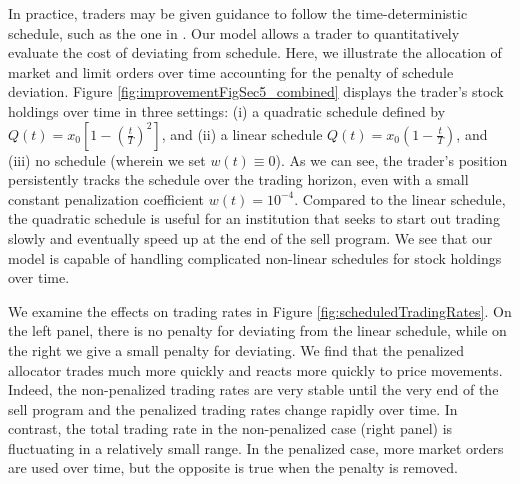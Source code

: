 \documentclass[12pt, letterpaper]{article}
\numberwithin{equation}{section}
\numberwithin{theorem}{section}
\begin{document}

In practice,  traders may be given guidance to follow the time-deterministic schedule, such as the one     in  \cite{AC2000}. Our   model   allows a trader to quantitatively evaluate the cost of deviating from schedule. Here, we illustrate the  allocation of  market and limit orders over time accounting for the penalty of schedule deviation.    Figure \ref{fig:improvementFigSec5_combined} displays  the trader's stock holdings over time in three settings: (i) a quadratic schedule defined by $Q(t)=x_0\left[1-\left(\frac{t}{T}\right)^2\right]$, and (ii) a linear schedule $Q(t) = x_0\left(1-\frac{t}{T}\right)$, and (iii) no schedule (wherein we set $w(t)\equiv0$). As we can see, the trader's position persistently tracks the schedule over the trading horizon, even with a small  constant penalization coefficient $w(t)=10^{-4}$. Compared to the linear schedule, the quadratic schedule is useful for an institution that seeks to start out trading slowly and eventually speed up at the end of the sell program. We see that our model is capable of handling complicated non-linear schedules for stock holdings over time. 

We examine   the effects on trading rates in Figure \ref{fig:scheduledTradingRates}. On the left panel, there is no penalty for deviating from the linear schedule, while on the right we give a small penalty for deviating. We find that the penalized allocator trades much more quickly and reacts more quickly to price movements. Indeed, the non-penalized trading rates are very stable until the very end of the sell program and the penalized trading rates change rapidly over time. In contrast, the total trading rate in the non-penalized case (right panel) is fluctuating in a relatively small range. In the penalized case, more market orders are used over time, but the opposite is true when the penalty is removed. 
\end{document}

